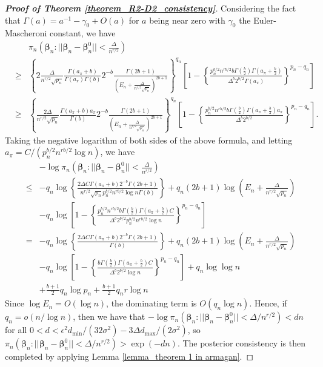 \documentclass[12pt]{article}
\begin{document}
\begin{proof} [\textbf{Proof of Theorem \ref{theorem_R2-D2_consistency}}]
	Considering  the fact that  $\Gamma(a)=  a^{-1} -\gamma_0+ O(a)$ for $a$ being near zero with $\gamma_0$   the Euler-Mascheroni constant,
	we have
	{\small \begin{eqnarray*}
		&& \pi_n( \bm\beta_n:|| \bm\beta_n- \bm\beta_n^0|| < \frac{\Delta}{n^{r/2}}) \\
		&\geq & 	\left\{  2\frac{\Delta}{n^{r/2}{\sqrt{p_n}} }
		\frac{\Gamma(a_{\pi}+b)}{\Gamma(a_{\pi})\Gamma(b)}  2^{- b}\frac{\Gamma(2b+1)}{(E_n  + \frac{\Delta}{n^{r/2}{\sqrt{p_n}} })^{2b+1}}
		\right\}^{q_n}
		\left[1 -	\left\{ \frac{p_n^{b/2} n^{r b/2} b\Gamma(\frac{b}{2})\Gamma(a_{\pi}+\frac{b}{2})    }{ \Delta^b 2^{b/2}\Gamma(a_{\pi}) } \right\}^{p_n-q_n}  \right]\\
		&\geq & 	\left\{  \frac{ 2 \Delta}{  n^{r/2}{\sqrt{p_n}} }
		\frac{\Gamma(a_{\pi}+b) a_{\pi}}{ \Gamma(b)}  2^{- b} \frac{\Gamma(2b+1)}{(E_n   + \frac{\Delta}{n^{r/2}{\sqrt{p_n}} })^{2b+1}}
		\right\}^{q_n}
		\left[1 -  	\left\{   \frac{p_n^{b/2} n^{r b/2} b\Gamma(\frac{b}{2})\Gamma(a_{\pi}+\frac{b}{2}) a_{\pi}   }{ \Delta^b 2^{b/2}  } \right\}^{p_n-q_n} \right].
	\end{eqnarray*}}
	Taking the negative logarithm of both sides of the above formula, and letting $a_{\pi}= C/( p_n^{b/2} n^{r b/2 }\log n)$,
	we have
	\begin{eqnarray*}
		&& -\log \pi_n ( \bm\beta_n:|| \bm\beta_n- \bm\beta_n^0|| < \frac{\Delta}{n^{r/2}}) \nonumber\\
		& \leq & -q_n \log\left\{ \frac{2\Delta C  \Gamma(a_{\pi}+b) 2^{- b}  \Gamma(2b+1) }{ n^{r/2}{\sqrt{p_n}} p_n^{b/2} n^{r b/2 }\log n \Gamma(b)}  \right\}
		+ q_n ( 2b+1 ) \log (E_n  + \frac{\Delta}{n^{r/2}{\sqrt{p_n}} }) \\
		&& - q_n  \log \left[ 1 -	\left\{  \frac{p_n^{b/2} n^{r b/2} b\Gamma(\frac{b}{2})\Gamma(a_{\pi}+\frac{b}{2}) C   }{ \Delta^b 2^{b/2}  p_n^{b/2} n^{r b/2 }\log n } \right\}^{p_n-q_n} \right] \\
		& = & -q_n \log \left\{   \frac{2 \Delta C \Gamma(a_{\pi}+b) 2^{- b}  \Gamma(2b+1) }{ \Gamma(b)} \right\}   + q_n ( 2b+1 ) \log (E_n   + \frac{\Delta}{n^{r/2}{\sqrt{p_n}} })  \\
		&&	-    q_n  \log\left[ 1-	\left\{  \frac{  b\Gamma(\frac{b}{2})\Gamma(a_{\pi}+\frac{b}{2}) C   }{ \Delta^b 2^{b/2}  \log n } \right\}^{p_n-q_n}  \right]
		+   q_n\log\log n  \\
		&& +
		\frac{b+1}{2} q_n   \log p_n +   	\frac{b+1}{2} q_n r  \log n
	\end{eqnarray*}
Since $\log E_n = O(\log n)$, the dominating term is $O (q_n \log n)$. Hence, if $q_n = o(n/\log n )$, then we have that
	$-\log \pi_n ( \bm\beta_n:|| \bm\beta_n- \bm\beta_n^0|| < {\Delta}/ {n^{r/2}}) < dn$ for all  $0<d<\epsilon^2 d_\text{min}/(32\sigma^2) -3\Delta d_\text{max} /(2\sigma^2)$, so  $\pi_n( \bm\beta_n:|| \bm\beta_n- \bm\beta_n^0||  <  {\Delta}/{n^{r/2}})  > \exp(-dn)$. The posterior consistency is then completed by applying Lemma \ref{lemma_theorem 1 in armagan}.
\end{proof}
\end{document}
